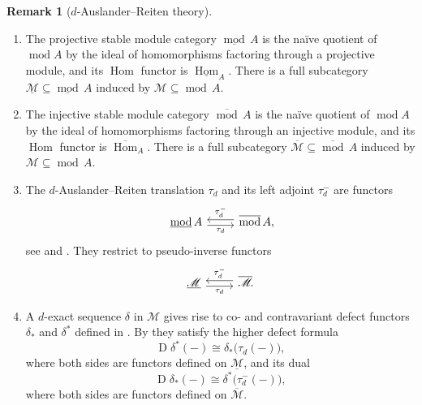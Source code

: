 \documentclass[12pt,reqno]{amsart}
\def\cM{\mathscr{M}}
\def\dual{\operatorname{D}}
\def\Hom{\operatorname{Hom}}
\def\mod{\operatorname{mod}}
\numberwithin{equation}{section}
\theoremstyle{definition}
\newtheorem{Remark}[Lemma]{Remark}
\theoremstyle{theorem}
\theoremstyle{definition}
\begin{document}
\begin{Remark}
[$d$-Auslander--Reiten theory]
\label{rmk:tau_d}
${\;}$
\begin{enumerate}
\setlength\itemsep{4pt}

  \item  The projective stable module category $\underline{ \mod }\,A$ is the na\"{i}ve quotient of $\mod A$ by the ideal of homomorphisms factoring through a projective module, and its $\Hom$ functor is $\underline{ \Hom }_A$.  There is a full subcategory $\underline{ \cM } \subseteq \underline{ \mod }\,A$ induced by $\cM \subseteq \mod\,A$.
  
  \item  The injective stable module category $\overline{ \mod }\,A$ is the na\"{i}ve quotient of $\mod A$ by the ideal of homomorphisms factoring through an injective module, and its $\Hom$ functor is $\overline{ \Hom }_A$.  There is a full subcategory $\overline{ \cM } \subseteq \overline{ \mod }\,A$ induced by $\cM \subseteq \mod\,A$.

  \item  The $d$-Auslander--Reiten translation $\tau_d$ and its left adjoint $\tau_d^-$ are functors
\[
  \begin{tikzcd}
	{\underline{ \mod }\,A} & {\overline{ \mod }\,A}\lefteqn{,}
	\arrow["{\tau_d}"', shift right=1, from=1-1, to=1-2]
	\arrow["{\tau_d^-}"', shift right=1, from=1-2, to=1-1]
  \end{tikzcd}
\]  
see \cite[thm.\ 2.3.1(1)]{Iyama_Auslander-correspondence} and \cite[thm.\ 1.4.1]{Iyama_Higher-dimensional-AR-theory}.  They restrict to pseudo-inverse functors
\[
  \begin{tikzcd}
	{\underline{ \cM }} & {\overline{ \cM }\!.}
	\arrow["{\tau_d}"', shift right=1, from=1-1, to=1-2]
	\arrow["{\tau_d^-}"', shift right=1, from=1-2, to=1-1]
  \end{tikzcd}
\]  

  \item  A $d$-exact sequence $\delta$ in $\cM$ gives rise to co- and contravariant defect functors $\delta_*$ and $\delta^*$ defined in \cite[def.\ 3.1]{Jasso-Kvamme_Introduction-to_higher_AR-theory}.  By \cite[thm.\ 3.8]{Jasso-Kvamme_Introduction-to_higher_AR-theory} they satisfy the higher defect formula
\begin{equation}
\label{equ:defect_formula}
  \dual\!\delta^*( - ) \cong \delta_*\big( \tau_d( - ) \big),
\end{equation}
where both sides are functors defined on $\underline{ \cM }$, and its dual
\begin{equation}
\label{equ:dual_defect_formula}
  \dual\!\delta_*( - ) \cong \delta^*\big( \tau^-_d( - ) \big),
\end{equation}
where both sides are functors defined on $\overline{ \cM }\!$.


\end{enumerate}
\end{Remark}
\end{document}
